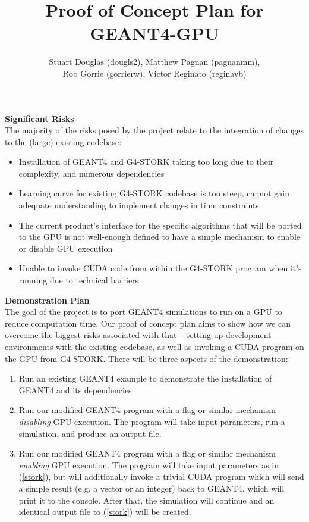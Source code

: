 \documentclass[12pt]{article}
\begin{document}
\title{\vspace{-4em}Proof of Concept Plan for GEANT4-GPU} \author{Stuart Douglas
(dougls2), Matthew Pagnan (pagnanmm), \\ Rob Gorrie (gorrierw), Victor Reginato
(reginavb)}
	
\maketitle

\textbf{Significant Risks}\\
The majority of the risks posed by the project relate to the integration of changes to the (large) existing codebase:
\begin{itemize}
\item Installation of GEANT4 and G4-STORK taking too long due to their complexity, and numerous dependencies
\item Learning curve for existing G4-STORK codebase is too steep, cannot gain adequate understanding to implement changes in time constraints
\item The current product's interface for the specific algorithms that will be ported to the GPU is not well-enough defined to have a simple mechanism to enable or disable GPU execution
\item Unable to invoke CUDA code from within the G4-STORK program when it's running due to technical barriers
\end{itemize}

\textbf{Demonstration Plan}\\
The goal of the project is to port GEANT4 simulations to run on a GPU to reduce computation time. Our proof of concept plan aims to show how we can overcome the biggest risks associated with that -- setting up development environments with the existing codebase, as well as invoking a CUDA program on the GPU from G4-STORK.
There will be three aspects of the demonstration:

\begin{enumerate}
\item Run an existing GEANT4 example to demonstrate the installation of GEANT4 and its dependencies
\item \label{stork} Run our modified GEANT4 program with a flag or similar mechanism \emph{disabling} GPU execution. The program will take input parameters, run a simulation, and produce an output file.
\item Run our modified GEANT4 program with a flag or similar mechanism \emph{enabling} GPU execution. The program will take input parameters as in (\ref{stork}), but will additionally invoke a trivial CUDA program which will send a simple result (e.g. a vector or an integer) back to GEANT4, which will print it to the console. After that, the simulation will continue and an identical output file to (\ref{stork}) will be created.
\end{enumerate}
\end{document}
